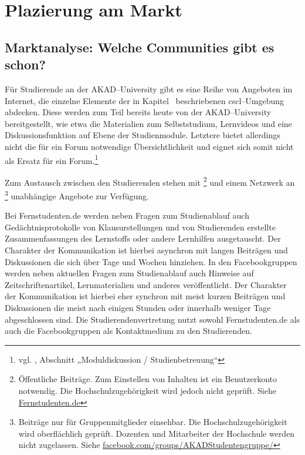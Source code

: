 \section{Plazierung am Markt} %
\label{sec:plazierung_am_markt}

\subsection{Marktanalyse: Welche Communities gibt es schon?} %
\label{sub:marktanalyse_welche_communities_gibt_es_schon}
Für Studierende an der AKAD–University gibt es eine Reihe von Angeboten im Internet, die einzelne Elemente der in Kapitel~ beschriebenen \ac{cscl}–Umgebung abdecken. Diese werden zum Teil bereits heute von der AKAD–University bereitgestellt, wie etwa die Materialien zum Selbststudium, Lernvideos und eine Diskussionsfunktion auf Ebene der Studienmodule. Letztere bietet allerdings nicht die für ein Forum notwendige Übersichtlichkeit und eignet sich somit nicht als Ersatz für ein Forum.\footnote{vgl. \cite{defstud}, Abschnitt „Moduldiskussion / Studienbetreuung“}

Zum Austausch zwischen den Studierenden stehen mit \footnote{Öffentliche Beiträge. Zum Einstellen von Inhalten ist ein Benutzerkonto notwendig. Die Hochschulzugehörigkeit wird jedoch nicht geprüft. Siehe \url{Fernstudenten.de}} und einem Netzwerk an \footnote{Beiträge nur für Gruppenmitglieder einsehbar. Die Hochschulzugehörigkeit wird oberflächlich geprüft. Dozenten und Mitarbeiter der Hochschule werden nicht zugelassen. Siehe \url{facebook.com/groups/AKADStudentengruppe/}} unabhängige Angebote zur Verfügung.

Bei Fernstudenten.de werden neben Fragen zum Studienablauf auch Gedächtnisprotokolle von Klausurstellungen und von Studierenden erstellte Zusammenfassungen des Lernstoffs oder andere Lernhilfen ausgetauscht. Der Charakter der Kommunikation ist hierbei asynchron mit langen Beiträgen und Diskussionen die sich über Tage und Wochen hinziehen. In den Facebookgruppen werden neben aktuellen Fragen zum Studienablauf auch Hinweise auf Zeitschriftenartikel, Lernmaterialien und anderes veröffentlicht. Der Charakter der Kommunikation ist hierbei eher synchron mit meist kurzen Beiträgen und Diskussionen die meist nach einigen Stunden oder innerhalb weniger Tage abgeschlossen sind.
Die Studierendenvertretung nutzt sowohl Fernstudenten.de als auch die Facebookgruppen als Kontaktmedium zu den Studierenden.

